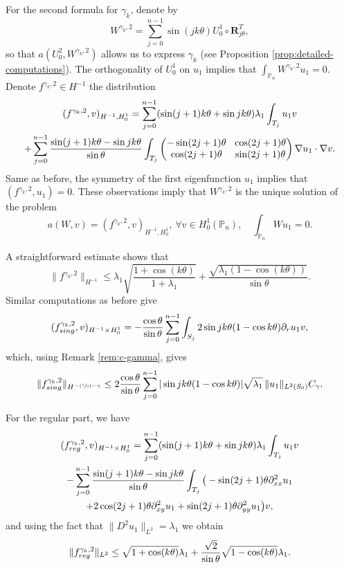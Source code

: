 \documentclass[11pt]{article}
\numberwithin{equation}{section}\newtheorem*{jepEnonce}{\jepEnonceTitle}\newenvironment{enonce*}[1]{\def\jepEnonceTitle{#1}\jepEnonce}{\endjepEnonce}\newtheorem*{conj*}{Conjecture}
\newcommand{\Psfrac}[2]{(\sfrac{#1}{#2})}
\newcommand{\colsep}{\arraycolsep4.5pt}
\theoremstyle{plain}
\theoremstyle{definition}
\newcommand{\bo}[1]{{\boldsymbol#1}}
\newcommand{\reg}{\textup{reg}}
\newcommand{\sing}{\textup{sing}}
\def\Pp{{\mathbb{P}_n}}
\newcommand{\lb}{\lambda}
\let\jepOriginalSfrac\sfrac
\renewcommand{\sfrac}[2]{{\jepOriginalSfrac{#1}{#2}}}
\begin{document}
For the second formula for $\gamma_k$, denote by
\[
W^{\gamma_k,2} = \sum_{j=0}^{n-1} \sin(jk\theta) U_0^1\circ \bo R_{j\theta}^T,
\]
so that $a(U_0^2,W^{\gamma_k,2})$ allows us to express $\gamma_k$ (see Proposition \ref{prop:detailed-computations}). The orthogonality of $U_0^1$ on $u_1$ implies that $\int_\Pp W^{\gamma_k,2}u_1=0$. Denote $f^{\gamma_k,2} \in H^{-1}$ the distribution
\vspace*{-5pt}
\begin{multline*}
(f^{\gamma_k,2},v)_{H^{-1},H_0^1}
= \sum_{j=0}^{n-1} (\sin(j+1)k\theta+\sin jk\theta) \lambda_1\int_{T_j} u_1 v\\\colsep
+ \sum_{j=0}^{n-1} \frac{\sin(j+1)k\theta-\sin jk\theta}{\sin \theta} \int_{T_j}\begin{pmatrix}
-\sin (2j+1)\theta & \cos (2j+1) \theta \\
\cos(2j+1)\theta & \sin (2j+1)\theta
\end{pmatrix}\nabla u_1 \cdot \nabla v.
\end{multline*}
Same as before, the symmetry of the first eigenfunction $u_1$ implies that $(f^{\gamma_k,2},u_1) = 0$. These observations imply that $W^{\gamma_k,2}$ is the unique solution of the problem
\[
a(W,v) = (f^{\gamma_k,2},v)_{H^{-1},H_0^1},\ \forall v \in H_0^1(\Pp),\quad \int_\Pp Wu_1=0.
\]

A straightforward estimate shows that
\[
\|f^{\gamma_k,2}\|_{H^{-1}} \leq \lambda_1 \sqrt{\frac{1+\cos(k\theta)}{1+\lambda_1}} +\frac{\sqrt{\lambda_1(1-\cos(k\theta))}}{\sin \theta}.
\]
Similar computations as before give
\[
(f_{\sing}^{\gamma_k,2}, v)_{H^{-1}\times H^1_0} = - \frac{\cos \theta}{\sin \theta} \sum_{j=0}^{n-1}\int_{S_j} 2 \sin jk\theta(1-\cos k \theta) \partial_r u_1 v,
\]
which, using Remark \ref{rem:c-gamma}, gives
\[
\|f_{\sing}^{\gamma_k,2}\|_{H^{-\Psfrac 12-\gamma}}\le 2\frac{\cos \theta}{\sin \theta}\sum_{j=0}^{n-1} | \sin jk\theta(1-\cos k \theta)| \sqrt{\lb_1}\,\|u_1\|_{L^2(S_0)} C_\gamma.
\]

For the regular part, we have
\vspace*{-5pt}
\begin{multline*}
(f_{\reg}^{\gamma_k,2}, v)_{H^{-1}\times H^1_0}= \sum_{j=0}^{n-1} (\sin (j+1)k\theta+\sin jk\theta) \lb_1 \int_{T_j} u_1v \\
- \sum_{j=0}^{n-1} \frac{\sin(j+1)k\theta-\sin jk\theta}{\sin \theta} \int_{T_j} \big (-\sin (2j+1)\theta \partial^2_{xx}u_1\\
+2 \cos (2j+1)\theta \partial^2_{xy} u_1+ \sin(2j+1)\theta \partial^2_{yy} u_1\big)v,
\end{multline*}
and using the fact that $\|D^2 u_1\|_{L^2} = \lambda_1$ we obtain
\[
\|f_{\reg}^{\gamma_k,2}\|_{L^2}\le \sqrt{1+\cos (k \theta)} \lb_1 +\frac{\sqrt{2}}{\sin \theta} \sqrt{1- \cos (k \theta)}\lb_1 .
\]
\end{document}
